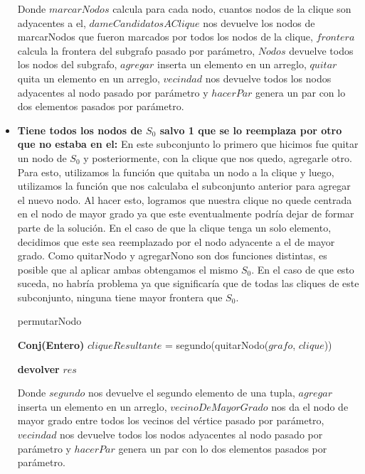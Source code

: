 \begin{itemize}
Donde $marcarNodos$ calcula para cada nodo, cuantos nodos de la clique son adyacentes a el, $dameCandidatosAClique$ nos devuelve los nodos de marcarNodos que fueron marcados por todos los nodos de la clique, $frontera$ calcula la frontera del subgrafo pasado por parámetro, $Nodos$ devuelve todos los nodos del subgrafo, $agregar$ inserta un elemento en un arreglo, $quitar$ quita un elemento en un arreglo, $vecindad$ nos devuelve todos los nodos adyacentes al nodo pasado por parámetro y $hacerPar$ genera un par con lo dos elementos pasados por parámetro. \newline

\item \textbf{Tiene todos los nodos de $S_{0}$ salvo 1 que se lo reemplaza por otro que no estaba en el:} \newline
En este subconjunto lo primero que hicimos fue quitar un nodo de $S_{0}$ y posteriormente, con la clique que nos quedo, agregarle otro. Para esto, utilizamos la función que quitaba un nodo a la clique y luego, utilizamos la función que nos calculaba el subconjunto anterior para agregar el nuevo nodo. Al hacer esto, logramos que nuestra clique no quede centrada en el nodo de mayor grado ya que este eventualmente podría dejar de formar parte de la solución.
En el caso de que la clique tenga un solo elemento, decidimos que este sea reemplazado por el nodo adyacente a el de mayor grado.  \newline
Como quitarNodo y agregarNono son dos funciones distintas, es posible que al aplicar ambas obtengamos el mismo $S_{0}$. En el caso de que esto suceda, no habría problema ya que significaría que de todas las cliques de este subconjunto, ninguna tiene mayor frontera que $S_{0}$.
\begin{algorithm}[H]
    \SetAlgoLined
    \caption{permutarNodo}
	
   \textbf{Conj(Entero)} $cliqueResultante$ = segundo(quitarNodo($grafo$, $clique$)) \\


    \textbf{devolver} $res$ \\
\end{algorithm}
Donde $segundo$ nos devuelve el segundo elemento de una tupla,  $agregar$ inserta un elemento en un arreglo, $vecinoDeMayorGrado$ nos da el nodo de mayor grado entre todos los vecinos del vértice pasado por parámetro, $vecindad$ nos devuelve todos los nodos adyacentes al nodo pasado por parámetro y $hacerPar$ genera un par con lo dos elementos pasados por parámetro. \newline
\end{itemize}

